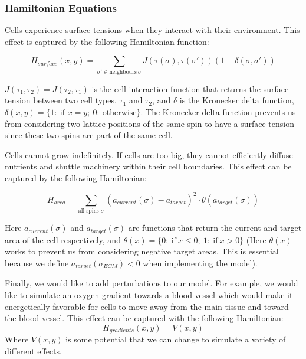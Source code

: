 \documentclass[12pt]{article}
\begin{document}
\subsubsection{Hamiltonian Equations}
Cells experience surface tensions when they interact with their environment. This effect is captured by the following Hamiltonian function:

\begin{equation}
	H_{surface} (x,y) = \sum_{\sigma' \in \text{neighbours}~\sigma} J(\tau(\sigma), \tau(\sigma'))(1-\delta(\sigma, \sigma'))
\end{equation}

$J(\tau_1, \tau_2)=J(\tau_2, \tau_1)$ is the cell-interaction function that returns the surface tension between two cell types, $\tau_1$ and $\tau_2$, and $\delta$ is the Kronecker delta function, $\delta(x,y)=\{1:~\text{if }x=y;~0:~\text{otherwise}\}$. The Kronecker delta function prevents us from considering two lattice positions of the same spin to have a surface tension since these two spins are part of the same cell.

Cells cannot grow indefinitely. If cells are too big, they cannot efficiently diffuse nutrients and shuttle machinery within their cell boundaries. This effect can be captured by the following Hamiltonian:

\begin{equation}
	H_{area} = \sum_{\text{all spins }\sigma} (a_{current}(\sigma)-a_{target})^2 \cdot \theta(a_{target}(\sigma))
	\label{H_area}
\end{equation}

Here $a_{current}(\sigma)$ and $a_{target}(\sigma)$ are functions that return the current and target area of the cell respectively, and $\theta(x)=\{0:~\text{if}~x\leq 0;~1:~\text{if}~x>0\}$ (Here $\theta(x)$ works to prevent us from considering negative target areas. This is essential because we define $a_{target}(\sigma_{ECM}) < 0$ when implementing the model).

Finally, we would like to add perturbations to our model. For example, we would like to simulate an oxygen gradient towards a blood vessel which would make it energetically favorable for cells to move away from the main tissue and toward the blood vessel. This effect can be captured with the following Hamiltonian:
\begin{equation}
	H_{gradients}(x,y) = V(x,y)
\end{equation}
Where $V(x,y)$ is some potential that we can change to simulate a variety of different effects.
\end{document}

